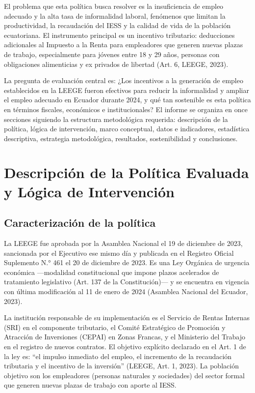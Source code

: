 \documentclass[12pt,spanish]{article}
\begin{document}
El problema que esta política busca resolver es la insuficiencia de
empleo adecuado y la alta tasa de informalidad laboral, fenómenos que
limitan la productividad, la recaudación del IESS y la calidad de vida
de la población ecuatoriana. El instrumento principal es un incentivo
tributario: deducciones adicionales al Impuesto a la Renta para
empleadores que generen nuevas plazas de trabajo, especialmente para
jóvenes entre 18 y 29 años, personas con obligaciones alimenticias y ex
privados de libertad (Art. 6, LEEGE, 2023).

La pregunta de evaluación central es: ¿Los incentivos a la generación de
empleo establecidos en la LEEGE fueron efectivos para reducir la
informalidad y ampliar el empleo adecuado en Ecuador durante 2024, y qué
tan sostenible es esta política en términos fiscales, económicos e
institucionales? El informe se organiza en once secciones siguiendo la
estructura metodológica requerida: descripción de la política, lógica de
intervención, marco conceptual, datos e indicadores, estadística
descriptiva, estrategia metodológica, resultados, sostenibilidad y
conclusiones.

\section{Descripción de la Política Evaluada y Lógica de
Intervención}\label{descripciuxf3n-de-la-poluxedtica-evaluada-y-luxf3gica-de-intervenciuxf3n}

\subsection{Caracterización de la
política}\label{caracterizaciuxf3n-de-la-poluxedtica}

La LEEGE fue aprobada por la Asamblea Nacional el 19 de diciembre de
2023, sancionada por el Ejecutivo ese mismo día y publicada en el
Registro Oficial Suplemento N.° 461 el 20 de diciembre de 2023. Es una
Ley Orgánica de urgencia económica ---modalidad constitucional que
impone plazos acelerados de tratamiento legislativo (Art. 137 de la
Constitución)--- y se encuentra en vigencia con última modificación al
11 de enero de 2024 (Asamblea Nacional del Ecuador, 2023).

La institución responsable de su implementación es el Servicio de Rentas
Internas (SRI) en el componente tributario, el Comité Estratégico de
Promoción y Atracción de Inversiones (CEPAI) en Zonas Francas, y el
Ministerio del Trabajo en el registro de nuevos contratos. El objetivo
explícito declarado en el Art. 1 de la ley es: ``el impulso inmediato
del empleo, el incremento de la recaudación tributaria y el incentivo de
la inversión'' (LEEGE, Art. 1, 2023). La población objetivo son los
empleadores (personas naturales y sociedades) del sector formal que
generen nuevas plazas de trabajo con aporte al IESS.
\end{document}
